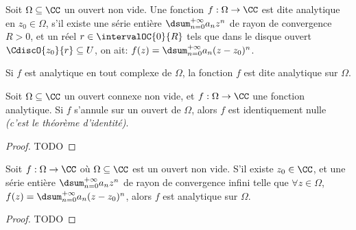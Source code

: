

\begin{defi}
    Soit $\Omega \subseteq \CC$ un ouvert non vide.
	Une fonction $f: \Omega \rightarrow \CC$ est dite analytique en $z_0 \in \Omega$, 
	s'il existe
	une série entière $\dsum_{n = 0}^{+\infty} a_n z^n$
	de rayon de convergence $R > 0$,
	et
	un réel $r \in \intervalOC{0}{R}$ tels que dans le disque ouvert $\CdiscO{z_0}{r} \subseteq U$, on ait:
	$f(z) = \dsum_{n = 0}^{+\infty} a_n (z - z_0)^n$.

	\smallskip
	
	Si $f$ est analytique en tout complexe de $\Omega$,
	la fonction $f$ est dite analytique sur $\Omega$.
\end{defi}




\begin{fact} \label{analytic-identity}
    Soit $\Omega \subseteq \CC$ un ouvert connexe non vide,
    et
    $f: \Omega \rightarrow \CC$ une fonction analytique.
	Si $f$ s'annule sur un ouvert de $\Omega$, alors $f$ est identiquement nulle
	\emph{(c'est le théorème d'identité)}.  
\end{fact}


\begin{proof}
	TODO
\end{proof}




\begin{fact} \label{power-series-vs-analytic}
    Soit $f: \Omega \rightarrow \CC$ où $\Omega \subseteq \CC$ est un ouvert non vide.
    S'il existe
    $z_0 \in \CC$,
    et
    une série entière $\dsum_{n = 0}^{+\infty} a_n z^n$ de rayon de convergence infini
    telle que
	$\forall z \in \Omega$, $f(z) = \dsum_{n = 0}^{+\infty} a_n (z - z_0)^n$,
	alors
	$f$ est analytique sur $\Omega$. 
\end{fact}


\begin{proof}
	TODO
\end{proof}


